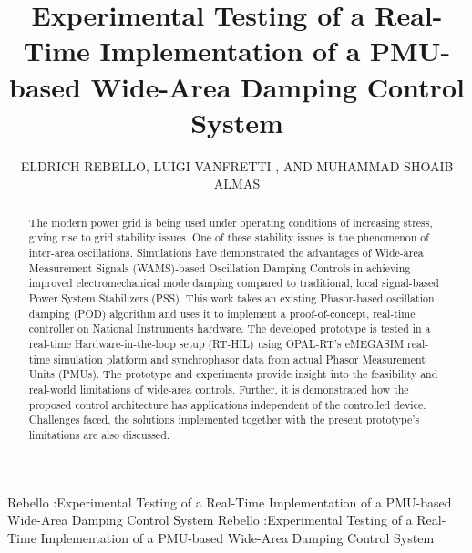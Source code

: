 \documentclass{ieeeaccess}
\begin{document}
\doi{}

\title{Experimental Testing of a Real-Time Implementation of a PMU-based Wide-Area Damping Control System}
\author{\uppercase{Eldrich Rebello},
\uppercase{Luigi Vanfretti  , and Muhammad Shoaib Almas
}
}
\address[1]{Wind Energy Institute of Canada, 21741 PE-12, Tignish, Prince Edward Island, Canada (e-mail:eldrich.rebello@weican.ca)}
\address[2]{Rensselaer Polytechnic Institute, 110 Eighth Street
Troy, NY USA 12180  (e-mail: vanfrl@rpi.edu)}
\address[3]{ABB HVDC, Ludvika, Sweden SE-100 44 (email:shoaib.almas@gmail.com)}

\markboth
{Rebello \headeretal:Experimental Testing of a Real-Time Implementation of a PMU-based Wide-Area Damping Control System}
{Rebello \headeretal:Experimental Testing of a Real-Time Implementation of a PMU-based Wide-Area Damping Control System}


\begin{abstract}
The modern power grid is being used under operating conditions of increasing stress, giving rise to grid stability issues. One of these stability issues is the phenomenon of inter-area oscillations. Simulations have demonstrated the advantages of Wide-area Measurement Signals (WAMS)-based Oscillation Damping Controls in achieving improved electromechanical mode damping compared to traditional, local signal-based Power System Stabilizers (PSS). This work takes an existing Phasor-based oscillation damping (POD) algorithm and uses it to implement a proof-of-concept, real-time controller on National Instruments hardware. The developed prototype is tested in a real-time Hardware-in-the-loop setup (RT-HIL) using OPAL-RT's eMEGASIM real-time simulation platform and synchrophasor data from actual Phasor Measurement Units (PMUs). The prototype and experiments provide insight into the feasibility and real-world limitations of wide-area controls. Further, it is demonstrated how the proposed control architecture has applications independent of the controlled device. Challenges faced, the solutions implemented together with the present prototype's limitations are also discussed.
\end{abstract}
\end{document}
